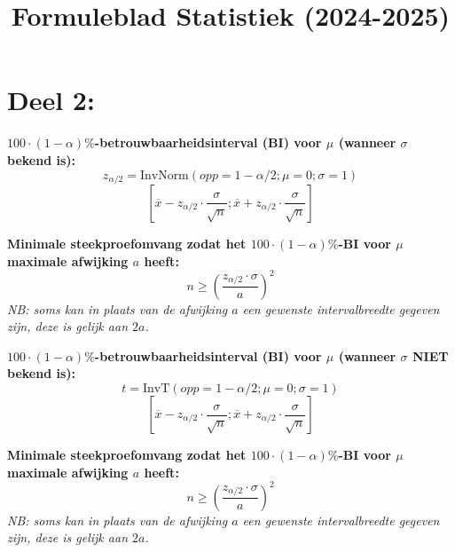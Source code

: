 \documentclass[11pt,a4paper,dutch]{article} %
\title{Formuleblad Statistiek (2024-2025)}
\author{}
\date{}
\begin{document}
\maketitle



\newpage

\section*{Deel 2:}
\textbf{$100\cdot(1-\alpha)\%$-betrouwbaarheidsinterval (BI) voor $\mu$ (wanneer $\sigma$ bekend is):}
\[
    z_{\alpha/2} = \text{InvNorm}(opp=1-\alpha/2; \mu=0; \sigma=1)
\]
\[
    [\overline{x} - z_{\alpha/2} \cdot \frac{\sigma}{\sqrt{n}}; \overline{x} + z_{\alpha/2} \cdot \frac{\sigma}{\sqrt{n}}]
\]

\textbf{Minimale steekproefomvang zodat het $100\cdot(1-\alpha)\%$-BI voor $\mu$ maximale afwijking $a$ heeft:}
\[
    n \ge \left( \frac{z_{\alpha/2} \cdot \sigma}{a} \right)^2
\]
{\itshape NB: soms kan in plaats van de afwijking $a$ een gewenste intervalbreedte gegeven zijn, deze is gelijk aan $2a$.}

\textbf{$100\cdot(1-\alpha)\%$-betrouwbaarheidsinterval (BI) voor $\mu$ (wanneer $\sigma$ NIET bekend is):}
\[
    t = \text{InvT}(opp=1-\alpha/2; \mu=0; \sigma=1)
\]
\[
    [\overline{x} - z_{\alpha/2} \cdot \frac{\sigma}{\sqrt{n}}; \overline{x} + z_{\alpha/2} \cdot \frac{\sigma}{\sqrt{n}}]
\]

\textbf{Minimale steekproefomvang zodat het $100\cdot(1-\alpha)\%$-BI voor $\mu$ maximale afwijking $a$ heeft:}
\[
    n \ge \left( \frac{z_{\alpha/2} \cdot \sigma}{a} \right)^2
\]
{\itshape NB: soms kan in plaats van de afwijking $a$ een gewenste intervalbreedte gegeven zijn, deze is gelijk aan $2a$.}





\end{document}
